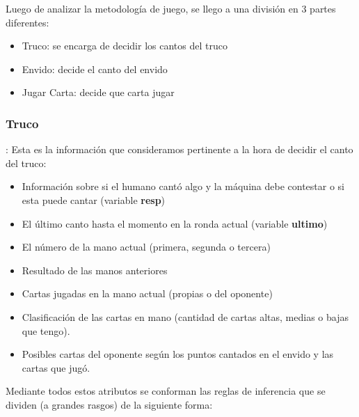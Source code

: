 \documentclass[12pt,a4paper]{article}
\begin{document}

Luego de analizar la metodolog\'ia de juego, se llego a una divisi\'on en 3 partes diferentes:
\begin{itemize}
\item Truco: se encarga de decidir los cantos del truco
\item Envido: decide el canto del envido
\item Jugar Carta: decide que carta jugar
\end{itemize}
 

\subsubsection{Truco}:
Esta es la informaci\'on que consideramos pertinente a la hora de decidir el canto del truco:
\begin{itemize}
\item Informaci\'on sobre si el humano cant\'o algo y la m\'aquina debe contestar o si esta puede cantar (variable \textbf{resp})
\item El \'ultimo canto hasta el momento en la ronda actual (variable \textbf{ultimo})
\item El n\'umero de la mano actual (primera, segunda o tercera)
\item Resultado de las manos anteriores
\item Cartas jugadas en la mano actual (propias o del oponente)
\item Clasificaci\'on de las cartas en mano (cantidad de cartas altas, medias o bajas que tengo).
\item Posibles cartas del oponente seg\'un los puntos cantados en el envido y las cartas que jug\'o.
\end{itemize}

Mediante todos estos atributos se conforman las reglas de inferencia que se dividen (a grandes rasgos) de la 
siguiente forma:
\end{document}
